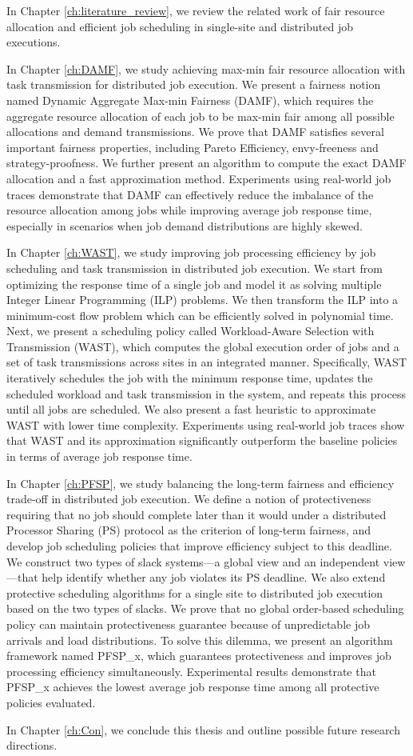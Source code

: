 In Chapter \ref{ch:literature_review}, we review the related work of fair resource allocation and efficient job scheduling in single-site and distributed job executions.

In Chapter \ref{ch:DAMF}, we study achieving max-min fair resource allocation with task transmission for distributed job execution. We present a fairness notion named Dynamic Aggregate Max-min Fairness (DAMF), which requires the aggregate resource allocation of each job to be max-min fair among all possible allocations and demand transmissions. We prove that DAMF satisfies several important fairness properties, including Pareto Efficiency, envy-freeness and strategy-proofness. We further present an algorithm to compute the exact DAMF allocation and a fast approximation method. Experiments using real-world job traces demonstrate that DAMF can effectively reduce the imbalance of the resource allocation among jobs while improving average job response time, especially in scenarios when job demand distributions are highly skewed.

In Chapter \ref{ch:WAST}, we study improving job processing efficiency by job scheduling and task transmission in distributed job execution. We start from optimizing the response time of a single job and model it as solving multiple Integer Linear Programming (ILP) problems. We then transform the ILP into a minimum-cost flow problem which can be efficiently solved in polynomial time. Next, we present a scheduling policy called Workload-Aware Selection with Transmission (WAST), which computes the global execution order of jobs and a set of task transmissions across sites in an integrated manner. Specifically, WAST iteratively schedules the job with the minimum response time, updates the scheduled workload and task transmission in the system, and repeats this process until all jobs are scheduled. We also present a fast heuristic to approximate WAST with lower time complexity. Experiments using real-world job traces show that WAST and its approximation significantly outperform the baseline policies in terms of average job response time.

In Chapter \ref{ch:PFSP}, we study balancing the long-term fairness and efficiency trade-off in distributed job execution. We define a notion of protectiveness requiring that no job should complete later than it would under a distributed Processor Sharing (PS) protocol as the criterion of long-term fairness, and develop job scheduling policies that improve efficiency subject to this deadline. We construct two types of slack systems—a global view and an independent view—that help identify whether any job violates its PS deadline. We also extend protective scheduling algorithms for a single site to distributed job execution based on the two types of slacks. We prove that no global order-based scheduling policy can maintain protectiveness guarantee because of unpredictable job arrivals and load distributions. To solve this dilemma, we present an algorithm framework named PFSP\_x, which guarantees protectiveness and improves job processing efficiency simultaneously. Experimental results demonstrate that PFSP\_x achieves the lowest average job response time among all protective policies evaluated.

In Chapter \ref{ch:Con}, we conclude this thesis and outline possible future research directions.

